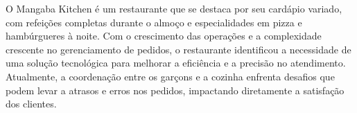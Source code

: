 \hspace{4.5mm}
O Mangaba Kitchen é um restaurante que se destaca por seu cardápio variado, com refeições completas durante o almoço e especialidades em pizza e hambúrgueres à noite. Com o crescimento das operações e a complexidade crescente no gerenciamento de pedidos, o restaurante identificou a necessidade de uma solução tecnológica para melhorar a eficiência e a precisão no atendimento. Atualmente, a coordenação entre os garçons e a cozinha enfrenta desafios que podem levar a atrasos e erros nos pedidos, impactando diretamente a satisfação dos clientes.